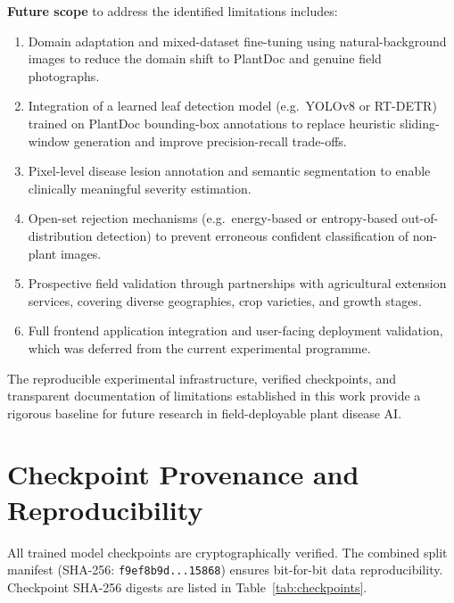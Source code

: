 \documentclass[pdflatex,sn-mathphys-num]{sn-jnl}
\begin{document}
\textbf{Future scope} to address the identified limitations includes:
\begin{enumerate}
  \item Domain adaptation and mixed-dataset fine-tuning using natural-background images
        to reduce the domain shift to PlantDoc and genuine field photographs.
  \item Integration of a learned leaf detection model (e.g.\ YOLOv8 or RT-DETR) trained
        on PlantDoc bounding-box annotations to replace heuristic sliding-window generation
        and improve precision-recall trade-offs.
  \item Pixel-level disease lesion annotation and semantic segmentation to enable
        clinically meaningful severity estimation.
  \item Open-set rejection mechanisms (e.g.\ energy-based or entropy-based out-of-distribution
        detection) to prevent erroneous confident classification of non-plant images.
  \item Prospective field validation through partnerships with agricultural extension
        services, covering diverse geographies, crop varieties, and growth stages.
  \item Full frontend application integration and user-facing deployment validation, which
        was deferred from the current experimental programme.
\end{enumerate}

The reproducible experimental infrastructure, verified checkpoints, and transparent
documentation of limitations established in this work provide a rigorous baseline for
future research in field-deployable plant disease AI.


\section*{Checkpoint Provenance and Reproducibility}

All trained model checkpoints are cryptographically verified. The combined split
manifest (SHA-256: \texttt{f9ef8b9d...15868}) ensures bit-for-bit data reproducibility.
Checkpoint SHA-256 digests are listed in Table~\ref{tab:checkpoints}.
\end{document}
